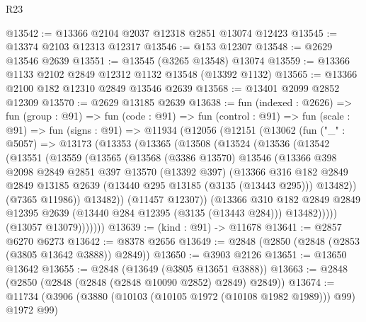 \begin{lexlean}{R23}
\begin{coremodule}
@13542 := @13366 @2104 @2037 @12318 @2851 @13074 @12423
@13545 := @13374 @2103 @12313 @12317
@13546 := @153 @12307
@13548 := @2629 @13546 @2639
@13551 := @13545 (@3265 @13548) @13074
@13559 := @13366 @1133 @2102 @2849 @12312 @1132 @13548 (@13392 @1132)
@13565 := @13366 @2100 @182 @12310 @2849 @13546 @2639
@13568 := @13401 @2099 @2852 @12309
@13570 := @2629 @13185 @2639
@13638 := fun (indexed : @2626) =>
  fun (group : @91) =>
  fun (code : @91) =>
  fun (control : @91) =>
  fun (scale : @91) =>
  fun (signs : @91) =>
  @11934
    (@12056
      (@12151
        (@13062
          (fun ("_" : @5057) =>
          @13173
            (@13353
              (@13365
                (@13508
                  (@13524
                    (@13536
                      (@13542
                        (@13551
                          (@13559
                            (@13565
                              (@13568
                                (@3386 @13570)
                                @13546
                                (@13366
                                  @398
                                  @2098
                                  @2849
                                  @2851
                                  @397
                                  @13570
                                  (@13392 @397)
                                  (@13366
                                    @316
                                    @182
                                    @2849
                                    @2849
                                    @13185
                                    @2639
                                    (@13440 @295 @13185 (@3135 (@13443 @295)))
                                    @13482))
                                (@7365 @11986))
                              @13482))
                          (@11457 @12307))
                        (@13366
                          @310
                          @182
                          @2849
                          @2849
                          @12395
                          @2639
                          (@13440 @284 @12395 (@3135 (@13443 @284)))
                          @13482)))))
                (@13057 @13079)))))))
@13639 := (kind : @91) -> @11678
@13641 := @2857 @6270 @6273
@13642 := @8378 @2656
@13649 := @2848 (@2850 (@2848 (@2853 (@3805 @13642 @3888)) @2849))
@13650 := @3903 @2126
@13651 := @13650 @13642
@13655 := @2848 (@13649 (@3805 @13651 @3888))
@13663 := @2848 (@2850 (@2848 (@2848 (@2848 @10090 @2852) @2849) @2849))
@13674 := @11734 (@3906 (@3880 (@10103 (@10105 @1972 (@10108 @1982 @1989))) @99) @1972 @99)

\end{coremodule}
\end{lexlean}
